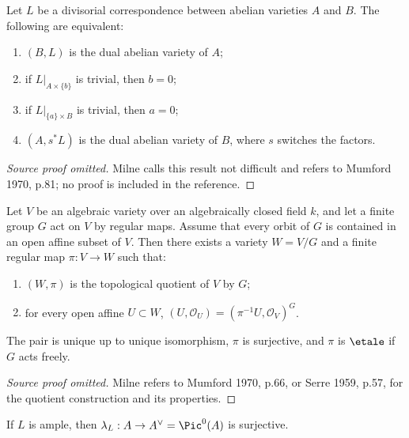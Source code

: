 \begin{theorem}
\label{thm:milne-dual-divisorial-criterion}

Let $L$ be a divisorial correspondence between abelian varieties $A$ and $B$.
The following are equivalent:
\begin{enumerate}
\item $(B,L)$ is the dual abelian variety of $A$;
\item if $L|_{A\times\{b\}}$ is trivial, then $b=0$;
\item if $L|_{\{a\}\times B}$ is trivial, then $a=0$;
\item $(A,s^*L)$ is the dual abelian variety of $B$, where $s$ switches the
factors.
\end{enumerate}
\end{theorem}

\begin{proof}[Source proof omitted]
Milne calls this result not difficult and refers to Mumford 1970, p.81; no
proof is included in the reference.
\end{proof}

\begin{proposition}
\label{prop:milne-finite-quotient}

Let $V$ be an algebraic variety over an algebraically closed field $k$, and let
a finite group $G$ act on $V$ by regular maps.  Assume that every orbit of $G$
is contained in an open affine subset of $V$.  Then there exists a variety
$W=V/G$ and a finite regular map $\pi:V\to W$ such that:
\begin{enumerate}
\item $(W,\pi)$ is the topological quotient of $V$ by $G$;
\item for every open affine $U\subset W$,
$(U,\mathcal O_U)=(\pi^{-1}U,\mathcal O_V)^G$.
\end{enumerate}
The pair is unique up to unique isomorphism, $\pi$ is surjective, and $\pi$
is $\etale$ if $G$ acts freely.
\end{proposition}

\begin{proof}[Source proof omitted]
Milne refers to Mumford 1970, p.66, or Serre 1959, p.57, for the quotient
construction and its properties.
\end{proof}

\begin{proposition}
\label{prop:milne-lambda-ample}

If $L$ is ample, then $\lambda_L:A\to A^\vee=\Pic^0(A)$ is surjective.
\end{proposition}

